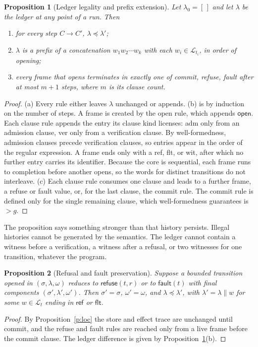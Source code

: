 \documentclass[11pt]{article}
\newtheorem{proposition}{Proposition}
\newcommand{\step}{\longrightarrow}
\newcommand{\refuseval}{\mathsf{refuse}}
\newcommand{\faultval}{\mathsf{fault}}
\newcommand{\app}{\mathbin{\|}}
\newcommand{\pre}{\preceq}
\begin{document}
\begin{proposition}[Ledger legality and prefix extension]\label{p:legal}
Let $\lambda_0=[\,]$ and let $\lambda$ be the ledger at any point of a run. Then
\begin{enumerate}[label=(\alph*)]
\item for every step $C\step C'$, $\lambda\pre\lambda'$;
\item $\lambda$ is a prefix of a concatenation $w_1w_2\cdots w_k$ with each $w_i\in\mathcal L_{t_i}$, in order of opening;
\item every frame that opens terminates in exactly one of \textsf{commit}, \textsf{refuse}, \textsf{fault} after at most $m+1$ steps, where $m$ is its clause count.
\end{enumerate}
\end{proposition}
\begin{proof}
(a) Every rule either leaves $\lambda$ unchanged or appends. (b) is by induction on the number of steps. A frame is created by the open rule, which appends $\mathsf{open}$. Each clause rule appends the entry its clause kind licenses: \textsf{adm} only from an admission clause, \textsf{ver} only from a verification clause. By well-formedness, admission clauses precede verification clauses, so entries appear in the order of the regular expression. A frame ends only with a \textsf{ref}, \textsf{flt}, or \textsf{wit}, after which no further entry carries its identifier. Because the core is sequential, each frame runs to completion before another opens, so the words for distinct transitions do not interleave. (c) Each clause rule consumes one clause and leads to a further frame, a refuse or fault value, or, for the last clause, the commit rule. The commit rule is defined only for the single remaining clause, which well-formedness guarantees is $>g$.
\end{proof}

The proposition says something stronger than that history persists. Illegal histories cannot be generated by the semantics. The ledger cannot contain a witness before a verification, a witness after a refusal, or two witnesses for one transition, whatever the program.

\begin{proposition}[Refusal and fault preservation]\label{p:ref}
Suppose a bounded transition opened in $(\sigma,\lambda,\omega)$ reduces to $\refuseval(t,r)$ or to $\faultval(t)$ with final components $(\sigma',\lambda',\omega')$. Then $\sigma'=\sigma$, $\omega'=\omega$, and $\lambda\pre\lambda'$, with $\lambda'=\lambda\app w$ for some $w\in\mathcal L_t$ ending in $\mathsf{ref}$ or $\mathsf{flt}$.
\end{proposition}
\begin{proof}
By Proposition~\ref{p:loc} the store and effect trace are unchanged until commit, and the refuse and fault rules are reached only from a live frame before the commit clause. The ledger difference is given by Proposition~\ref{p:legal}(b).
\end{proof}
\end{document}
